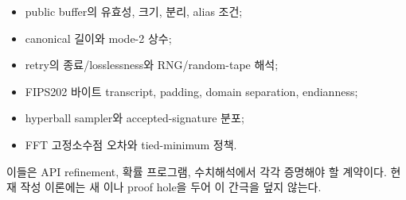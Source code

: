 \begin{itemize}
  \item public buffer의 유효성, 크기, 분리, alias 조건;
  \item canonical 길이와 mode-2 상수;
  \item retry의 종료/losslessness와 RNG/random-tape 해석;
  \item FIPS202 바이트 transcript, padding, domain separation, endianness;
  \item hyperball sampler와 accepted-signature 분포;
  \item FFT 고정소수점 오차와 tied-minimum 정책.
\end{itemize}

이들은 API refinement, 확률 프로그램, 수치해석에서 각각 증명해야 할 계약이다.
현재 작성 이론에는 새 이나 proof hole을 두어 이 간극을
덮지 않는다.

